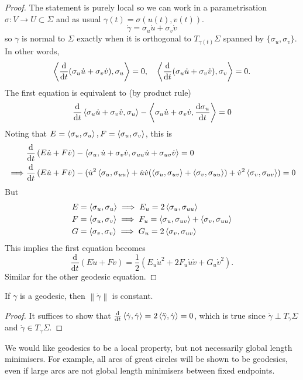\documentclass[a4paper]{article}
\begin{document}
\begin{proof}
	The statement is purely local so we can work in a parametrisation $ \sigma:V\to U \subset \Sigma $ and as usual $ \gamma(t) = \sigma(u(t),v(t)) $.
	\[
		\dot{\gamma} = \sigma_u \dot{u} + \sigma_v \dot{v}
	\]
	so $ \ddot{\gamma} $ is normal to $\Sigma$ exactly when it is orthogonal to $ T_{\gamma(t)}\Sigma $ spanned by $ \{\sigma_u,\sigma_v\} $. In other words,
	\[
		\left\langle{\dv{}{t} \qty( \sigma_u \dot{u} + \sigma_v \dot{v}),\sigma_u}\right\rangle = 0,\quad 
		\left\langle{\dv{}{t} \qty( \sigma_u \dot{u} + \sigma_v \dot{v}),\sigma_v}\right\rangle = 0.
	\]
	The first equation is equivalent to (by product rule)
	\[
		\dv{}{t} \left\langle{\sigma_u \dot{u} + \sigma_v \dot{v},\sigma_u}\right\rangle - \left\langle{\sigma_u \dot{u} + \sigma_v \dot{v}, \dv{\sigma_u}{t} }\right\rangle = 0
	\]
	Noting that $ E = \left\langle{\sigma_u, \sigma_u}\right\rangle , F = \left\langle{\sigma_u,\sigma_v}\right\rangle$, this is 
	\begin{align*}
		&\frac{\mathrm{d}}{\mathrm{d}t} \left( E\dot{u}+F\dot{v} \right) -\left\langle{\sigma_u, \dot{u}+\sigma_v \dot{v}, \sigma_{uu}\dot{u}+\sigma_{uv} \dot{v}}\right\rangle = 0\\ 
		\implies & \frac{\mathrm{d}}{\mathrm{d}t} \left( E\dot{u}+F\dot{v} \right) - (\dot{u}^2 \left\langle{\sigma_u,\sigma_{uu}}\right\rangle + \dot{u}\dot{v} (\left\langle{\sigma_u,\sigma_{uv}}\right\rangle+\left\langle{\sigma_v,\sigma_{uu}}\right\rangle)+\dot{v}^2\left\langle{\sigma_v,\sigma_{uv}}\right\rangle)=0
	\end{align*}
	But 
	\begin{align*}
		& E = \left\langle{\sigma_u,\sigma_u}\right\rangle \implies E_u = 2\left\langle{\sigma_u,\sigma_{uu}}\right\rangle\\ 
		& F = \left\langle{\sigma_u,\sigma_v}\right\rangle \implies F_u = \left\langle{\sigma_u,\sigma_{uv}}\right\rangle + \left\langle{\sigma_v, \sigma_{uu}}\right\rangle\\ 
		& G = \left\langle{\sigma_v,\sigma_v}\right\rangle \implies G_u = 2 \left\langle{\sigma_v,\sigma_{uv}}\right\rangle
	\end{align*}
	This implies the first equation becomes 
	\[
		\frac{\mathrm{d}}{\mathrm{d}t}(E \dot{u} + F \dot{v}) = \frac{1}{2}(E_u \dot{u}^2 + 2 F_u \dot{u}\dot{v} + G_u \dot{v}^2) . 
	\]
	Similar for the other geodesic equation. 
\end{proof}

\begin{corollary}
	If $\gamma$ is a geodesic, then $ \left\| \dot{\gamma} \right\|  $ is constant. 
\end{corollary}
\begin{proof}
	It suffices to show that $ \dv{}{t}\left\langle{\dot{\gamma},\dot{\gamma}}\right\rangle= 2\left\langle{\ddot{\gamma},\dot{\gamma}}\right\rangle=0 $, which is true since $ \ddot{\gamma} \perp T_\gamma\Sigma $ and $ \dot{\gamma}\in T_\gamma\Sigma $. 
\end{proof}
\begin{remark}
	We would like geodesics to be a local property, but not necessarily global length minimisers.
	For example, all arcs of great circles will be shown to be geodesics, even if large arcs are not global length minimisers between fixed endpoints.
\end{remark}
\end{document}
